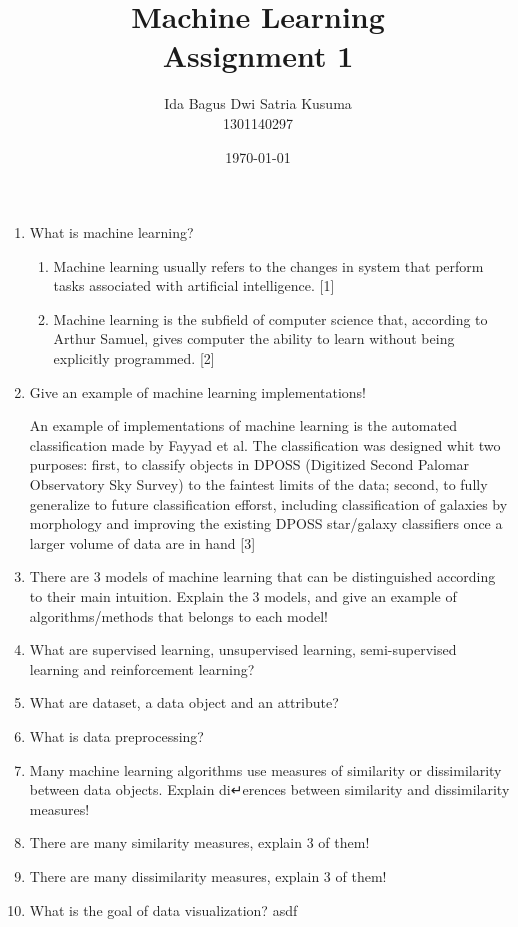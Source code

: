 \documentclass[12pt]{article}%
\begin{document}
\title{Machine Learning \protect\\ Assignment 1}
\author{Ida Bagus Dwi Satria Kusuma \protect\\ 1301140297}
\date{\today}
\maketitle

\begin{enumerate}
	\item What is machine learning? 
	\begin{enumerate}
		\item Machine learning usually refers to the changes in system that perform tasks associated with artificial intelligence. [1]
		\item Machine learning is the subfield of computer science that, according to Arthur Samuel, gives computer the ability to learn without being explicitly programmed. [2]
	\end{enumerate}

	\item Give an example of machine learning implementations!
	\par An example of implementations of machine learning is the automated classification made by Fayyad et al. The classification was designed whit two purposes: first, to classify objects in DPOSS (Digitized Second Palomar Observatory Sky Survey) to the faintest limits of the data; second, to fully generalize to future classification efforst, including classification of galaxies by morphology and improving the existing DPOSS star/galaxy classifiers once a larger volume of data are in hand [3]

	\item There are 3 models of machine learning that can be distinguished according to their main intuition. Explain the 3 models, and give an example of algorithms/methods that belongs to each model!

	\item What are supervised learning, unsupervised learning, semi-supervised learning and reinforcement learning?

	\item What are dataset, a data object and an attribute?

	\item What is data preprocessing?

	\item Many machine learning algorithms use measures of similarity or dissimilarity between data objects. Explain di↵erences between similarity and dissimilarity measures!

	\item There are many similarity measures, explain 3 of them!

	\item There are many dissimilarity measures, explain 3 of them!

	\item What is the goal of data visualization?
	asdf
\end{enumerate}
\end{document}

